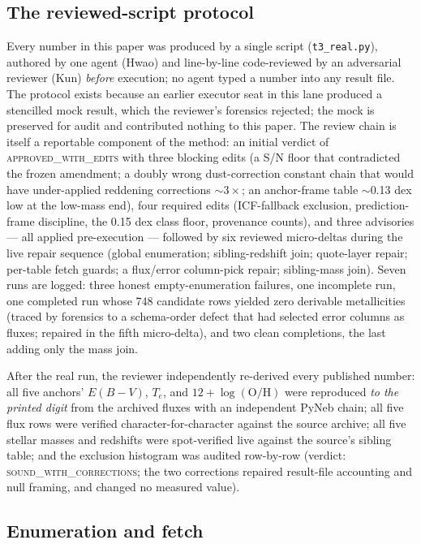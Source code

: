 \documentclass[twocolumn]{aastex702}
\newcommand{\te}{$T_e$}
\newcommand{\oh}{12+\log(\mathrm{O/H})}
\begin{document}
\subsection{The reviewed-script protocol}\label{sec:protocol}

Every number in this paper was produced by a single script (\texttt{t3\_real.py}),
authored by one agent (Hwao) and line-by-line code-reviewed by an adversarial
reviewer (Kun) \emph{before} execution; no agent typed a number into any result
file. The protocol exists because an earlier executor seat in this lane produced a
stencilled mock result, which the reviewer's forensics rejected; the mock is
preserved for audit and contributed nothing to this paper. The review chain is
itself a reportable component of the method: an initial verdict of
\textsc{approved\_with\_edits} with three blocking edits (a S/N floor that
contradicted the frozen amendment; a doubly wrong dust-correction constant chain
that would have under-applied reddening corrections $\sim3\times$; an anchor-frame
table $\sim$0.13 dex low at the low-mass end), four required edits (ICF-fallback
exclusion, prediction-frame discipline, the 0.15 dex class floor, provenance
counts), and three advisories --- all applied pre-execution --- followed by six
reviewed micro-deltas during the live repair sequence (global enumeration;
sibling-redshift join; quote-layer repair; per-table fetch guards; a flux/error
column-pick repair; sibling-mass join). Seven runs are logged: three honest
empty-enumeration failures, one incomplete run, one completed run whose 748
candidate rows yielded zero derivable metallicities (traced by forensics to a
schema-order defect that had selected error columns as fluxes; repaired in the
fifth micro-delta), and two clean completions, the last adding only the mass join.

After the real run, the reviewer independently re-derived every published number:
all five anchors' $E(B-V)$, \te{}, and $\oh$ were reproduced \emph{to the printed
digit} from the archived fluxes with an independent PyNeb chain; all five
flux rows were verified character-for-character against the source archive; all
five stellar masses and redshifts were spot-verified live against the source's
sibling table; and the exclusion histogram was audited row-by-row (verdict:
\textsc{sound\_with\_corrections}; the two corrections repaired result-file
accounting and null framing, and changed no measured value).

\subsection{Enumeration and fetch}\label{sec:enumeration}
\end{document}

